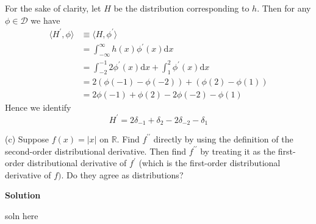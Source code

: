 \documentclass{article}
\begin{document}
For the sake of clarity, let $H$ be the distribution corresponding to
$h$. Then for any $\phi \in \mathcal{D}$ we have
%
\begin{align*}
    \langle H^\prime, \phi \rangle
        &\equiv \langle H, \phi^\prime \rangle \\
        &= \int_{- \infty}^{\infty} h(x) \phi^\prime(x) \mathrm{d} x \\
        &= \int_{-2}^{-1} 2 \phi^\prime(x) \mathrm{d} x
            + \int_{1}^{2} \phi^\prime(x) \mathrm{d} x \\
        &= 2 \left( \phi(-1) - \phi(-2) \right) + \left( \phi(2) - \phi(1) \right) \\
        &= 2 \phi(-1) + \phi(2) - 2 \phi(-2) - \phi(1)
\end{align*}
%
Hence we identify
%
\begin{equation*}
    H^\prime = 2 \delta_{-1} + \delta_2 - 2 \delta_{-2} - \delta_1
\end{equation*}

\vspace{5mm}

(c) Suppose $f(x) = |x|$ on $\mathbb{R}$. Find $f^{\prime \prime}$
directly by using the definition of the second-order distributional
derivative. Then find $f^{\prime \prime}$ by treating it as the
first-order distributional derivative of $f^{\prime}$ (which is the
first-order distributional derivative of $f)$. Do they agree as
distributions?

\textbf{Solution}

soln here
\end{document}
